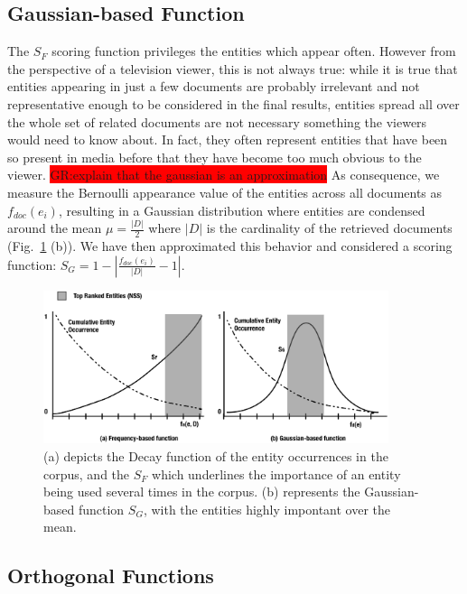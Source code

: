 \documentclass{llncs}
\newcommand{\todo}[1]{\colorbox{red}{#1}}
\begin{document}
\subsection{Gaussian-based Function}
The $S_F$ scoring function privileges the entities which appear often. However from the perspective of a television viewer, this is not always true: while it is true that entities appearing in just a few documents are probably irrelevant and not representative enough to be considered in the final results, entities spread all over the whole set of related documents are not necessary something the viewers would need to know about. In fact, they often represent entities that have been so present in media before that they have become too much obvious to the viewer. 
\todo{GR:explain that the gaussian is an approximation}
As consequence, we measure the Bernoulli appearance value of the entities across all documents as $f_{doc}(e_i)$, resulting in a Gaussian distribution where entities are condensed around the mean $\mu = \frac{|D|}{2}$ where $|D|$ is the cardinality of the retrieved documents (Fig.~\ref{fig:rankingStrategies} (b)). We have then approximated this behavior and considered a scoring function: $S_G = 1-\left | \frac{ f_{doc}(e_i) }{|D|} -1 \right |$.
\begin{figure}[h!]
\centering
\includegraphics[width=0.9\textwidth]{figure/RankingStrategies}
\caption{(a) depicts the Decay function of the entity occurrences in the corpus, and the $S_F$ which underlines the importance of an entity being used several times in the corpus. (b) represents the Gaussian-based function $S_G$, with the entities highly impontant over the mean.}
\label{fig:rankingStrategies}%
\end{figure}



\subsection{Orthogonal Functions}
\end{document}
